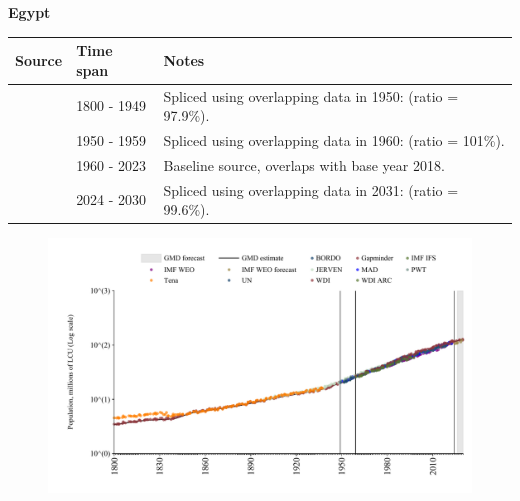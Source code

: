 \documentclass[12pt,a4paper,landscape]{article}
\begin{document}
\begin{adjustbox}{max totalsize={\paperwidth}{\paperheight},center}
\begin{minipage}[t][\textheight][t]{\textwidth}
\vspace*{0.5cm}
{}
\begin{center}
{\Large\bfseries Egypt}
\end{center}
\vspace{0.5cm}
\begin{table}[H]
\centering
\small
\begin{tabular}{|l|l|l|}
\hline
\textbf{Source} & \textbf{Time span} & \textbf{Notes} \\
\hline
\rowcolor{white}\cite{Gapminder}& 1800 - 1949 &Spliced using overlapping data in 1950: (ratio = 97.9\%).\\
\rowcolor{lightgray}\cite{IMF_IFS}& 1950 - 1959 &Spliced using overlapping data in 1960: (ratio = 101\%).\\
\rowcolor{white}\cite{WDI}& 1960 - 2023 &Baseline source, overlaps with base year 2018.\\
\rowcolor{lightgray}\cite{Gapminder}& 2024 - 2030 &Spliced using overlapping data in 2031: (ratio = 99.6\%).\\
\hline
\end{tabular}
\end{table}
\begin{figure}[H]
\centering
\includegraphics[width=\textwidth,height=0.6\textheight,keepaspectratio]{graphs/EGY_pop.pdf}
\end{figure}
\end{minipage}
\end{adjustbox}
\end{document}
